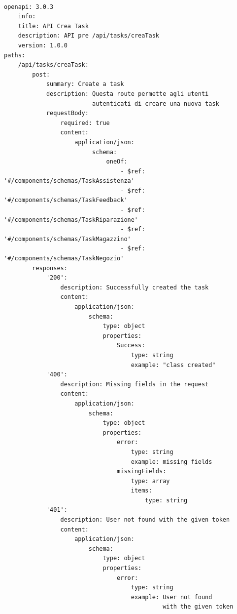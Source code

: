 \documentclass{report}
\begin{document}
\begin{verbatim}

openapi: 3.0.3
    info:
    title: API Crea Task
    description: API pre /api/tasks/creaTask
    version: 1.0.0
paths:
    /api/tasks/creaTask:
        post:
            summary: Create a task
            description: Questa route permette agli utenti
                         autenticati di creare una nuova task
            requestBody:
                required: true
                content:
                    application/json:
                         schema:
                             oneOf:
                                 - $ref: '#/components/schemas/TaskAssistenza'
                                 - $ref: '#/components/schemas/TaskFeedback'
                                 - $ref: '#/components/schemas/TaskRiparazione'
                                 - $ref: '#/components/schemas/TaskMagazzino'
                                 - $ref: '#/components/schemas/TaskNegozio'
        responses:
            '200':
                description: Successfully created the task
                content:
                    application/json:
                        schema:
                            type: object
                            properties:
                                Success:
                                    type: string
                                    example: "class created"
            '400':
                description: Missing fields in the request
                content:
                    application/json:
                        schema:
                            type: object
                            properties:
                                error:
                                    type: string
                                    example: missing fields
                                missingFields:
                                    type: array
                                    items:
                                        type: string
            '401':
                description: User not found with the given token
                content:
                    application/json:
                        schema:
                            type: object
                            properties:
                                error:
                                    type: string
                                    example: User not found
                                             with the given token

\end{verbatim}
\end{document}
